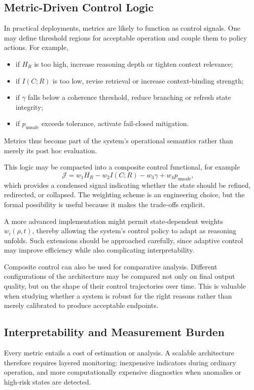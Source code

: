 \documentclass[12pt]{article}
\begin{document}
\subsection{Metric-Driven Control Logic}
In practical deployments, metrics are likely to function as control signals. One may define threshold regions for acceptable operation and couple them to policy actions. For example,
\begin{itemize}[leftmargin=2em]
    \item if $H_R$ is too high, increase reasoning depth or tighten context relevance;
    \item if $I(C;R)$ is too low, revise retrieval or increase context-binding strength;
    \item if $\gamma$ falls below a coherence threshold, reduce branching or refresh state integrity;
    \item if $p_{\text{unsafe}}$ exceeds tolerance, activate fail-closed mitigation.
\end{itemize}
Metrics thus become part of the system's operational semantics rather than merely its post hoc evaluation.

This logic may be compacted into a composite control functional, for example
\begin{equation}
\mathcal{J} = w_1 H_R - w_2 I(C;R) - w_3 \gamma + w_4 p_{\text{unsafe}},
\end{equation}
which provides a condensed signal indicating whether the state should be refined, redirected, or collapsed. The weighting scheme is an engineering choice, but the formal possibility is useful because it makes the trade-offs explicit.

A more advanced implementation might permit state-dependent weights $w_i(\rho,t)$, thereby allowing the system's control policy to adapt as reasoning unfolds. Such extensions should be approached carefully, since adaptive control may improve efficiency while also complicating interpretability.

Composite control can also be used for comparative analysis. Different configurations of the architecture may be compared not only on final output quality, but on the shape of their control trajectories over time. This is valuable when studying whether a system is robust for the right reasons rather than merely calibrated to produce acceptable endpoints.

\subsection{Interpretability and Measurement Burden}
Every metric entails a cost of estimation or analysis. A scalable architecture therefore requires layered monitoring: inexpensive indicators during ordinary operation, and more computationally expensive diagnostics when anomalies or high-risk states are detected.
\end{document}
